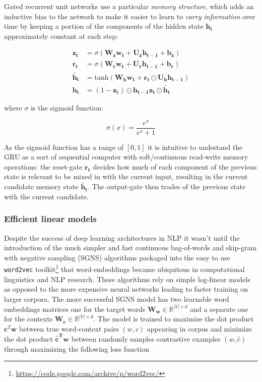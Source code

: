 Gated recurrent unit networks use a particular \emph{memory structure}, which
adds an inductive bias to the network to make it easier to learn to \emph{carry information}
over time by keeping a portion of the components of the hidden state $\mathbf{h_t}$
approximately constant at each step:

\begin{align}
\tag{update-gate}
\mathbf{z_t} &= \sigma(\mathbf{W_z} \mathbf{w_t} + \mathbf{U_z} \mathbf{h_{t-1}} + \mathbf{b_z}) \\
\tag{reset-gate}
\mathbf{r_t} &= \sigma(\mathbf{W_r} \mathbf{w_t} + \mathbf{U_r} \mathbf{h_{t-1}} + \mathbf{b_r})  \\
\tag{memory content}
\mathbf{\tilde{h_t}} &= \text{tanh}(\mathbf{W_h} \mathbf{w_t} + \mathbf{r_t} \odot  \mathbf{U_h} \mathbf{h_{t-1}}) \\
\tag{hidden state}
\mathbf{h_t} &= (1-\mathbf{z_t}) \odot \mathbf{h_{t-1}}  \mathbf{z_t} \odot \mathbf{\tilde{h_t}}
\end{align}

where $\sigma$ is the sigmoid function:

\begin{equation}
\sigma(x) = \frac{e^x}{e^x + 1}
\end{equation}

As the sigmoid function has a range of $[0,1]$ it is intuitive to undestand the GRU as a sort of
sequential computer with soft/continuous read-write memory operations: the reset-gate $\mathbf{r_t}$
decides how much of each component of the previous state is relevant to be mixed in with the
current input, resulting in the current candidate memory state $\mathbf{\tilde{h_t}}$. The output-gate
then trades of the previous state with the current candidate.



\subsubsection{Efficient linear models}
\label{sec:w2v}
Despite the success of deep learning architectures in NLP it wasn't until the introduction 
of the much simpler and fast continuous bag-of-words
and skip-gram with negative sampling (SGNS) algorithms \cite{mikolov2013efficient}
packaged into the easy to use \texttt{word2vec} 
toolkit\footnote{\url{https://code.google.com/archive/p/word2vec/}} that
word-embeddings became ubiquitous in computational linguistics and NLP research.
These algorithms rely on simple log-linear models as opposed to the more expensive
neural networks leading to faster training on larger corpora. The more successful SGNS
model has two learnable word embeddings matrices one for the target words
$\mathbf{W_w}  \in \mathbb{R}^{|V| \times d}$
and a separate one for the contexts $\mathbf{W_c} \in \mathbb{R}^{|V| \times d}$.
The model is trained to maximize the dot product $\mathbf{c}^T\mathbf{w}$
between true word-context pairs $(w,c)$ appearing in corpus and minimize the
dot product $\mathbf{\hat{c}^T\mathbf{w}}$ between randomly
samples contrastive examples $(w,\hat{c})$ through  maximizing the following loss function

